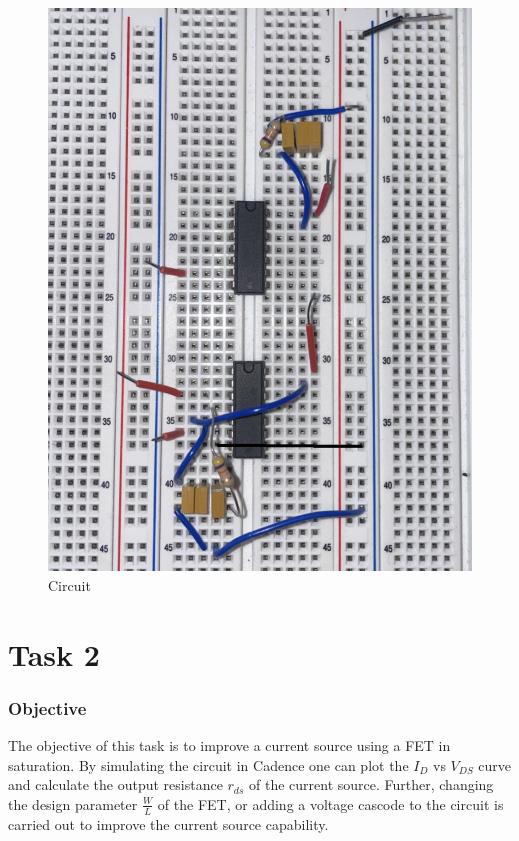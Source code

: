 \documentclass[onecolumn]{article}
\begin{document}
\begin{figure}[h!]
    \centering
    \includegraphics[scale=0.7]{LAB3/in3170lab3task1circuit.jpg}
    \caption{Circuit}
    \label{fig:enter-label}
\end{figure}


\section{Task 2}

\subsubsection*{Objective}
The objective of this task is to improve a current source using a FET in saturation. By simulating the circuit in Cadence one can plot the $I_D$ vs $V_{DS}$ curve and calculate the output resistance $r_{ds}$ of the current source. Further, changing the design parameter $\frac{W}{L}$ of the FET, or adding a voltage cascode to the circuit is carried out to improve the current source capability.
\end{document}

